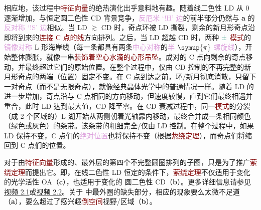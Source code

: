 相应地，该过程中\textcolor{Maroon}{特征向量}的\textcolor{NavyBlue}{绝热演化}出乎意料地有趣。随着\textcolor{NavyBlue}{线二色性 LD} 从 0 逐渐增加，与恒定\textcolor{NavyBlue}{圆二色性 CD} 背景竞争，\textcolor{Plum}{反厄米 `!H' 边}的前半部分仍然与 \textbf{a} 的 \textcolor{Plum}{反对称 `!S' 边}相似。当 \textcolor{NavyBlue}{LD} $\gtrsim$ \textcolor{NavyBlue}{CD} 时，\textcolor{PineGreen}{奇点环}被 \textcolor{NavyBlue}{LD} 撕裂，剩余的\textcolor{PineGreen}{新月形奇点}沿即将到来的\textcolor{Maroon}{连接 C 点的线}方向排列。之后，当 \textcolor{NavyBlue}{LD} 超越 \textcolor{NavyBlue}{CD} 时，两种 $\textcolor{PineGreen}{\pm}$ \textcolor{Maroon}{模式}的\textcolor{Plum}{镜像对称} \textcolor{PineGreen}{L 形海岸线}（每一条都具有两条\textcolor{Plum}{中心对称}的\textcolor{Plum}{半 $\symup{\pi}$ 螺旋线}），开始整体膨胀，就像一串\textcolor{Maroon}{装饰着空心水滴的心形吊坠}。成对的 \textcolor{PineGreen}{C 点}向剩余的\textcolor{PineGreen}{奇点}移动，并最终超过它们的原始位置。在整个过程中，仅由 \textcolor{NavyBlue}{CD} 控制的不再完整的\textcolor{PineGreen}{新月形奇点}的两端（位置）固定不变。在 \textcolor{PineGreen}{C 点}到达之前，\textcolor{PineGreen}{环}/\textcolor{PineGreen}{新月}彻底消散，只留下\textcolor{PineGreen}{一对奇点}（而不是\textcolor{PineGreen}{无限奇点}），就像经典\textcolor{PineGreen}{晶体光学}中的普通情况一样。随着 \textcolor{NavyBlue}{LD} 的进一步增加，\textcolor{PineGreen}{奇点}沿与 \textcolor{PineGreen}{C 点}相同的方向移动，但速度较慢，直到它们最终相遇并重合，此时 \textcolor{NavyBlue}{LD} 达到最大值，\textcolor{NavyBlue}{CD} 降至零。在 \textcolor{NavyBlue}{CD} \textcolor{NavyBlue}{衰减}过程中，同一\textcolor{Maroon}{模式}的\textcolor{PineGreen}{分裂（成 2 个区域的）L 湖}开始从两侧朝着\textcolor{PineGreen}{光轴}靠内移动，最终合并成一条相同颜色（绿色或灰色）的条带。该条带的粗细完全/仅由 \textcolor{NavyBlue}{LD} 控制。在整个过程中，如果 \textcolor{NavyBlue}{LD} 保持不变，\textcolor{PineGreen}{C 点们}的\textcolor{Plum}{绝对位置}也将保持不变（根据\textcolor{Maroon}{萦绕定理}\cite{berryOpticalSingularitiesBirefringent2003}），而\textcolor{PineGreen}{奇点们}将缩回到 \textcolor{PineGreen}{C 点们}的位置。

对于由\textcolor{Maroon}{特征向量}形成的、最外层的第四个不完整圆圈排列的子图，只是为了推广\textcolor{Maroon}{萦绕定理}而提出它。即，在\textcolor{NavyBlue}{线二色性 LD} 恒定的条件下，\textcolor{Maroon}{萦绕定理}不仅适用于变化的\textcolor{NavyBlue}{光学活性 OA}（\textbf{c}），也适用于变化的 \textcolor{NavyBlue}{圆二色性 CD}（\textbf{b}）。更多详细信息请参见\href{https://www.youtube.com/watch?v=xkMWXW29HYc}{视频 2.1}或\href{https://www.youtube.com/watch?v=PPZHhTvdfb0}{视频 2.2}。关于 中最外圈的缺失部分，相应的现象要么太微不足道（\textbf{a}），要么超过了感兴趣\textcolor{Maroon}{倒空间}视野/区域（\textbf{b}）。

